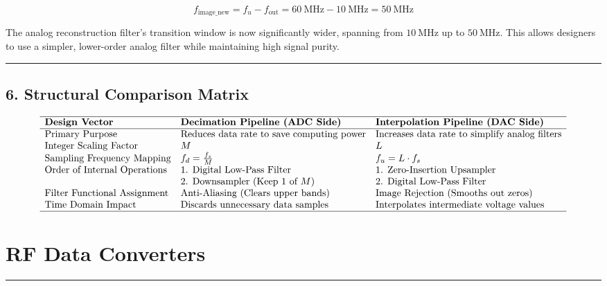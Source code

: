 \documentclass[
]{article}
\begin{document}
\[f_{\text{image\_new}} = f_u - f_{\text{out}} = 60\ \text{MHz} - 10\ \text{MHz} = 50\ \text{MHz}\]

The analog reconstruction filter's transition window is now
significantly wider, spanning from \(10\ \text{MHz}\) up to
\(50\ \text{MHz}\). This allows designers to use a simpler, lower-order
analog filter while maintaining high signal purity.

\begin{center}\rule{0.5\linewidth}{0.5pt}\end{center}

\subsection{6. Structural Comparison
Matrix}\label{structural-comparison-matrix}

\[\begin{array}{lll}
\hline
\textbf{Design Vector} & \textbf{Decimation Pipeline (ADC Side)} & \textbf{Interpolation Pipeline (DAC Side)} \\ \hline
\text{Primary Purpose} & \text{Reduces data rate to save computing power} & \text{Increases data rate to simplify analog filters} \\
\text{Integer Scaling Factor} & M & L \\
\text{Sampling Frequency Mapping} & f_d = \frac{f_s}{M} & f_u = L \cdot f_s \\
\text{Order of Internal Operations} & \text{1. Digital Low-Pass Filter} & \text{1. Zero-Insertion Upsampler} \\
& \text{2. Downsampler (Keep 1 of } M) & \text{2. Digital Low-Pass Filter} \\
\text{Filter Functional Assignment} & \text{Anti-Aliasing (Clears upper bands)} & \text{Image Rejection (Smooths out zeros)} \\
\text{Time Domain Impact} & \text{Discards unnecessary data samples} & \text{Interpolates intermediate voltage values} \\ \hline
\end{array}\]

\section{RF Data Converters}\label{rf-data-converters}

\begin{center}\rule{0.5\linewidth}{0.5pt}\end{center}
\end{document}

